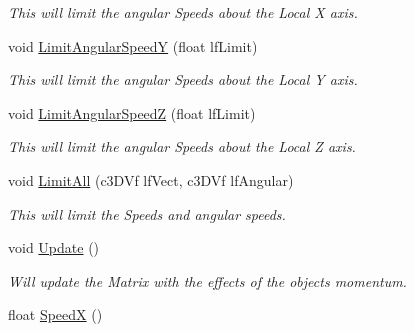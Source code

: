 \begin{DoxyCompactItemize}
\begin{DoxyCompactList}\small\item\em This will limit the angular Speeds about the Local X axis. \end{DoxyCompactList}\item 
\hypertarget{classc_momentum_aa2d5665da3652cb1386f197822f18dd1}{
void \hyperlink{classc_momentum_aa2d5665da3652cb1386f197822f18dd1}{LimitAngularSpeedY} (float lfLimit)}
\label{classc_momentum_aa2d5665da3652cb1386f197822f18dd1}

\begin{DoxyCompactList}\small\item\em This will limit the angular Speeds about the Local Y axis. \end{DoxyCompactList}\item 
\hypertarget{classc_momentum_a2039b235b89de1b6a597a0b108083b07}{
void \hyperlink{classc_momentum_a2039b235b89de1b6a597a0b108083b07}{LimitAngularSpeedZ} (float lfLimit)}
\label{classc_momentum_a2039b235b89de1b6a597a0b108083b07}

\begin{DoxyCompactList}\small\item\em This will limit the angular Speeds about the Local Z axis. \end{DoxyCompactList}\item 
\hypertarget{classc_momentum_ab5373c0fe8207cd19b986b9c4cf2882b}{
void \hyperlink{classc_momentum_ab5373c0fe8207cd19b986b9c4cf2882b}{LimitAll} (c3DVf lfVect, c3DVf lfAngular)}
\label{classc_momentum_ab5373c0fe8207cd19b986b9c4cf2882b}

\begin{DoxyCompactList}\small\item\em This will limit the Speeds and angular speeds. \end{DoxyCompactList}\item 
\hypertarget{classc_momentum_ae860280e817e7afef71222afd0b12ec8}{
void \hyperlink{classc_momentum_ae860280e817e7afef71222afd0b12ec8}{Update} ()}
\label{classc_momentum_ae860280e817e7afef71222afd0b12ec8}

\begin{DoxyCompactList}\small\item\em Will update the Matrix with the effects of the objects momentum. \end{DoxyCompactList}\item 
\hypertarget{classc_momentum_a4b3e9a8aa461415455166f5c0a56b4ef}{
float \hyperlink{classc_momentum_a4b3e9a8aa461415455166f5c0a56b4ef}{SpeedX} ()}
\label{classc_momentum_a4b3e9a8aa461415455166f5c0a56b4ef}


\end{DoxyCompactItemize}
